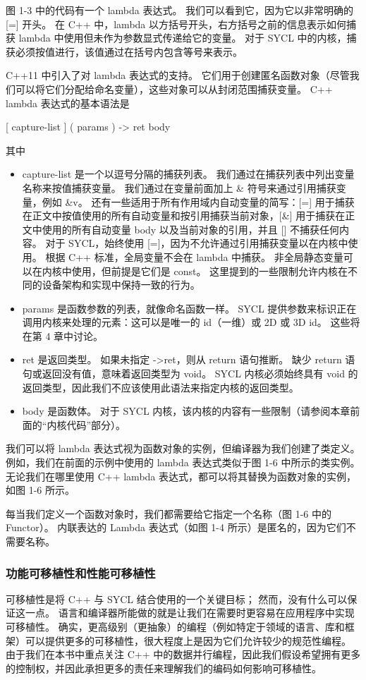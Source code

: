 图 1-3 中的代码有一个 lambda 表达式。 我们可以看到它，因为它以非常明确的 [=] 开头。 在 C++ 中，lambda 以方括号开头，右方括号之前的信息表示如何捕获 lambda 中使用但未作为参数显式传递给它的变量。 对于 SYCL 中的内核，捕获必须按值进行，该值通过在括号内包含等号来表示。

C++11 中引入了对 lambda 表达式的支持。 它们用于创建匿名函数对象（尽管我们可以将它们分配给命名变量），这些对象可以从封闭范围捕获变量。 C++ lambda 表达式的基本语法是

[ capture-list ] ( params ) -> ret { body }


其中

\begin{itemize}
	\item capture-list 是一个以逗号分隔的捕获列表。 我们通过在捕获列表中列出变量名称来按值捕获变量。 我们通过在变量前面加上 \& 符号来通过引用捕获变量，例如 \&v。 还有一些适用于所有作用域内自动变量的简写：[=] 用于捕获在正文中按值使用的所有自动变量和按引用捕获当前对象，[\&] 用于捕获在正文中使用的所有自动变量 body 以及当前对象的引用，并且 [] 不捕获任何内容。 对于 SYCL，始终使用 [=]，因为不允许通过引用捕获变量以在内核中使用。 根据 C++ 标准，全局变量不会在 lambda 中捕获。 非全局静态变量可以在内核中使用，但前提是它们是 const。 这里提到的一些限制允许内核在不同的设备架构和实现中保持一致的行为。

	\item params 是函数参数的列表，就像命名函数一样。 SYCL 提供参数来标识正在调用内核来处理的元素：这可以是唯一的 id（一维）或 2D 或 3D id。 这些将在第 4 章中讨论。

	\item ret 是返回类型。 如果未指定 ->ret，则从 return 语句推断。 缺少 return 语句或返回没有值，意味着返回类型为 void。 SYCL 内核必须始终具有 void 的返回类型，因此我们不应该使用此语法来指定内核的返回类型。

	\item body 是函数体。 对于 SYCL 内核，该内核的内容有一些限制（请参阅本章前面的“内核代码”部分）。
\end{itemize}

我们可以将 lambda 表达式视为函数对象的实例，但编译器为我们创建了类定义。 例如，我们在前面的示例中使用的 lambda 表达式类似于图 1-6 中所示的类实例。 无论我们在哪里使用 C++ lambda 表达式，都可以将其替换为函数对象的实例，如图 1-6 所示。

每当我们定义一个函数对象时，我们都需要给它指定一个名称（图 1-6 中的 Functor）。 内联表达的 Lambda 表达式（如图 1-4 所示）是匿名的，因为它们不需要名称。

\subsubsection{功能可移植性和性能可移植性}
可移植性是将 C++ 与 SYCL 结合使用的一个关键目标； 然而，没有什么可以保证这一点。 语言和编译器所能做的就是让我们在需要时更容易在应用程序中实现可移植性。 确实，更高级别（更抽象）的编程（例如特定于领域的语言、库和框架）可以提供更多的可移植性，很大程度上是因为它们允许较少的规范性编程。 由于我们在本书中重点关注 C++ 中的数据并行编程，因此我们假设希望拥有更多的控制权，并因此承担更多的责任来理解我们的编码如何影响可移植性。

